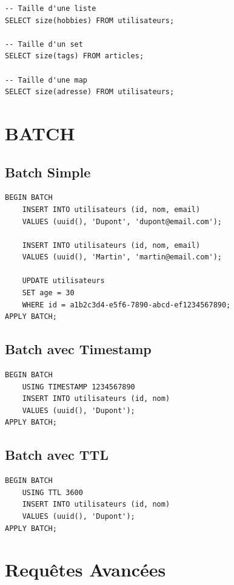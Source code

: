 \documentclass[11pt,a4paper]{article}
\begin{document}
\begin{lstlisting}
-- Taille d'une liste
SELECT size(hobbies) FROM utilisateurs;

-- Taille d'un set
SELECT size(tags) FROM articles;

-- Taille d'une map
SELECT size(adresse) FROM utilisateurs;
\end{lstlisting}

\newpage

\section{BATCH}

\subsection{Batch Simple}

\begin{lstlisting}
BEGIN BATCH
    INSERT INTO utilisateurs (id, nom, email)
    VALUES (uuid(), 'Dupont', 'dupont@email.com');
    
    INSERT INTO utilisateurs (id, nom, email)
    VALUES (uuid(), 'Martin', 'martin@email.com');
    
    UPDATE utilisateurs
    SET age = 30
    WHERE id = a1b2c3d4-e5f6-7890-abcd-ef1234567890;
APPLY BATCH;
\end{lstlisting}

\subsection{Batch avec Timestamp}

\begin{lstlisting}
BEGIN BATCH
    USING TIMESTAMP 1234567890
    INSERT INTO utilisateurs (id, nom)
    VALUES (uuid(), 'Dupont');
APPLY BATCH;
\end{lstlisting}

\subsection{Batch avec TTL}

\begin{lstlisting}
BEGIN BATCH
    USING TTL 3600
    INSERT INTO utilisateurs (id, nom)
    VALUES (uuid(), 'Dupont');
APPLY BATCH;
\end{lstlisting}

\newpage

\section{Requêtes Avancées}
\end{document}
